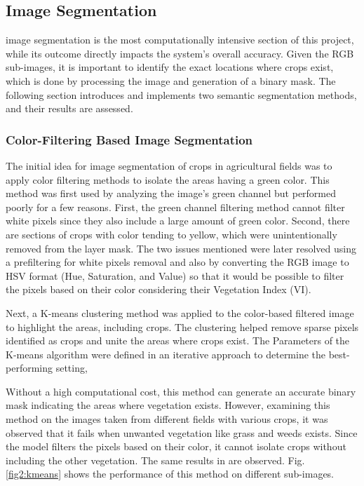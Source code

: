 \documentclass[conference]{IEEEtran}
\begin{document}
\subsection{Image Segmentation}\label{Image Segmentation}
image segmentation is the most computationally intensive section of this project, while its outcome directly impacts the system's overall accuracy. Given the RGB sub-images, it is important to identify the exact locations where crops exist, which is done by processing the image and generation of a binary mask. The following section introduces and implements two semantic segmentation methods, and their results are assessed.

\subsubsection{Color-Filtering Based Image Segmentation}\leavevmode

The initial idea for image segmentation of crops in agricultural fields was to apply color filtering methods to isolate the areas having a green color. This method was first used by analyzing the image's green channel but performed poorly for a few reasons. First, the green channel filtering method cannot filter white pixels since they also include a large amount of green color. Second, there are sections of crops with color tending to yellow, which were unintentionally removed from the layer mask. The two issues mentioned were later resolved using a prefiltering for white pixels removal and also by converting the RGB image to HSV format (Hue, Saturation, and Value) so that it would be possible to filter the pixels based on their color considering their Vegetation Index (VI).

Next, a K-means clustering method was applied to the color-based filtered image to highlight the areas, including crops. The clustering helped remove sparse pixels identified as crops and unite the areas where crops exist. The Parameters of the K-means algorithm were defined in an iterative approach to determine the best-performing setting,

Without a high computational cost, this method can generate an accurate binary mask indicating the areas where vegetation exists. However, examining this method on the images taken from different fields with various crops, it was observed that it fails when unwanted vegetation like grass and weeds exists. Since the model filters the pixels based on their color, it cannot isolate crops without including the other vegetation. The same results in
\cite{b5} are observed.
Fig.
\ref{fig2:kmeans} shows the performance of this method on different sub-images.
\end{document}
